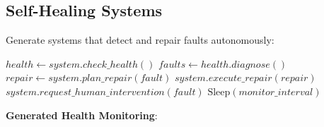 \subsection{Self-Healing Systems}

Generate systems that detect and repair faults autonomously:

\begin{algorithm}
\caption{Self-Healing Loop}
\begin{algorithmic}[1]
        \State $health \gets system.check\_health()$
            \State $faults \gets health.diagnose()$
                \State $repair \gets system.plan\_repair(fault)$
                    \State $system.execute\_repair(repair)$
                \Else
                    \State $system.request\_human\_intervention(fault)$
                \EndIf
            \EndFor
        \EndIf
        \State $\text{Sleep}(monitor\_interval)$
    \EndWhile
\EndProcedure
\end{algorithmic}
\end{algorithm}

\textbf{Generated Health Monitoring}:

